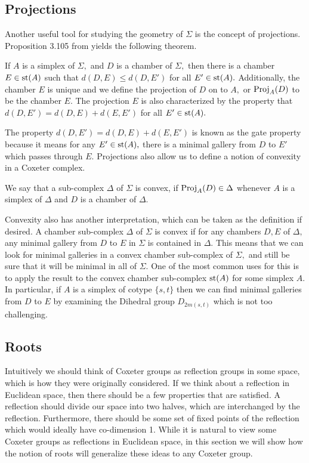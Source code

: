 \documentclass[class=book, crop=false,12 pt]{standalone}
\begin{document}
\subsection{Projections}
Another useful tool for studying the geometry of $\Sigma$ is the concept of projections. Proposition 3.105 from \cite{buildings} yields the following theorem.

\begin{theorem}
	If $A$ is a simplex of $\Sigma,$ and $D$ is a chamber of $\Sigma,$ then there is a chamber $E\in \mathrm{st}(A)$ such that $d(D,E)\le d(D,E')$ for all $E'\in \mathrm{st}(A).$ Additionally, the chamber $E$ is unique and we define the projection of $D$ on to $A,$ or $\mathrm{Proj}_A(D)$ to be the chamber $E.$ The projection $E$ is also characterized by the property that $d(D,E')=d(D,E)+d(E,E')$ for all $E'\in \mathrm{st}(A).$
\end{theorem}

The property $d(D,E')=d(D,E)+d(E,E')$ is known as the gate property because it means for any $E'\in \mathrm{st}(A),$ there is a minimal gallery from $D$ to $E'$ which passes through $E.$ Projections also allow us to define a notion of convexity in a Coxeter complex.

\begin{defn}
	\label{defn:convex}
	We say that a sub-complex $\Delta$ of $\Sigma$ is convex, if $\mathrm{Proj}_{A}(D)\in \Delta$ whenever $A$ is a simplex of $\Delta$ and $D$ is a chamber of $\Delta.$
\end{defn}

Convexity also has another interpretation, which can be taken as the definition if desired. A chamber sub-complex $\Delta$ of $\Sigma$ is convex if for any chambers $D,E$ of $\Delta,$ any minimal gallery from $D$ to $E$ in $\Sigma$ is contained in $\Delta.$ This means that we can look for minimal galleries in a convex chamber sub-complex of $\Sigma,$ and still be sure that it will be minimal in all of $\Sigma.$ One of the most common uses for this is to apply the result to the convex chamber sub-complex $\mathrm{st}(A)$ for some simplex $A.$ In particular, if $A$ is a simplex of cotype $\{s,t\}$ then we can find minimal galleries from $D$ to $E$ by examining the Dihedral group $D_{2m(s,t)}$ which is not too challenging.

\subsection{Roots}
Intuitively we should think of Coxeter groups as reflection groups in some space, which is how they were originally considered. If we think about a reflection in Euclidean space, then there should be a few properties that are satisfied. A reflection should divide our space into two halves, which are interchanged by the reflection. Furthermore, there should be some set of fixed points of the reflection which would ideally have co-dimension 1. While it is natural to view some Coxeter groups as reflections in Euclidean space, in this section we will show how the notion of roots will generalize these ideas to any Coxeter group.
\end{document}
